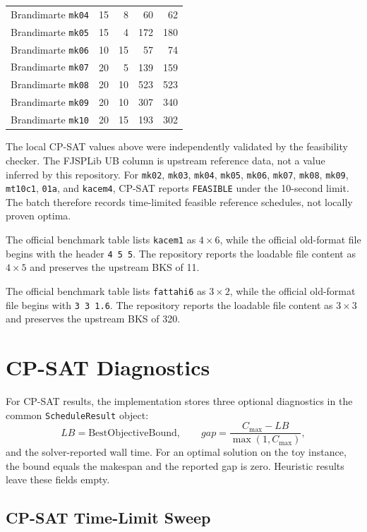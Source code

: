 ﻿\documentclass[11pt]{article}
\begin{document}
\begin{table}[h]
\begin{tabular}{lrrrr}
Brandimarte \texttt{mk04} & 15 & 8 & 60 & 62 \\
Brandimarte \texttt{mk05} & 15 & 4 & 172 & 180 \\
Brandimarte \texttt{mk06} & 10 & 15 & 57 & 74 \\
Brandimarte \texttt{mk07} & 20 & 5 & 139 & 159 \\
Brandimarte \texttt{mk08} & 20 & 10 & 523 & 523 \\
Brandimarte \texttt{mk09} & 20 & 10 & 307 & 340 \\
Brandimarte \texttt{mk10} & 20 & 15 & 193 & 302 \\
\bottomrule
\end{tabular}
\end{table}

The local CP-SAT values above were independently validated by the feasibility
checker. The FJSPLib UB column is upstream reference data, not a value inferred
by this repository. For \texttt{mk02}, \texttt{mk03}, \texttt{mk04},
\texttt{mk05}, \texttt{mk06}, \texttt{mk07}, \texttt{mk08}, \texttt{mk09},
\texttt{mt10c1}, \texttt{01a}, and \texttt{kacem4}, CP-SAT reports
\texttt{FEASIBLE} under the 10-second limit. The batch therefore records
time-limited feasible reference schedules, not locally proven optima.

The official benchmark table lists \texttt{kacem1} as $4 \times 6$, while the
official old-format file begins with the header \texttt{4 5 5}. The repository
reports the loadable file content as $4 \times 5$ and preserves the upstream
BKS of 11.

The official benchmark table lists \texttt{fattahi6} as $3 \times 2$, while the
official old-format file begins with \texttt{3 3 1.6}. The repository reports
the loadable file content as $3 \times 3$ and preserves the upstream BKS of 320.

\section{CP-SAT Diagnostics}

For CP-SAT results, the implementation stores three optional diagnostics in
the common \texttt{ScheduleResult} object:
\[
LB = \text{BestObjectiveBound},
\qquad
gap = \frac{C_{\max}-LB}{\max(1,C_{\max})},
\]
and the solver-reported wall time. For an optimal solution on the toy instance,
the bound equals the makespan and the reported gap is zero. Heuristic results
leave these fields empty.

\subsection{CP-SAT Time-Limit Sweep}
\end{document}
